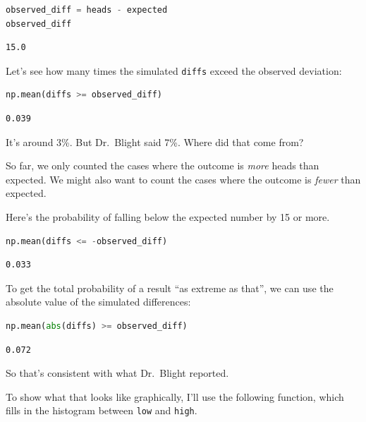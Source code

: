 \begin{lstlisting}[language=Python,style=source]
observed_diff = heads - expected
observed_diff
\end{lstlisting}

\begin{lstlisting}[style=output]
15.0
\end{lstlisting}

Let's see how many times the simulated \passthrough{\lstinline!diffs!}
exceed the observed deviation:

\begin{lstlisting}[language=Python,style=source]
np.mean(diffs >= observed_diff)
\end{lstlisting}

\begin{lstlisting}[style=output]
0.039
\end{lstlisting}

It's around 3\%. But Dr.~Blight said 7\%. Where did that come from?

So far, we only counted the cases where the outcome is \emph{more} heads
than expected. We might also want to count the cases where the outcome
is \emph{fewer} than expected.

Here's the probability of falling below the expected number by 15 or
more.

\begin{lstlisting}[language=Python,style=source]
np.mean(diffs <= -observed_diff)
\end{lstlisting}

\begin{lstlisting}[style=output]
0.033
\end{lstlisting}

To get the total probability of a result ``as extreme as that'', we can
use the absolute value of the simulated differences:

\begin{lstlisting}[language=Python,style=source]
np.mean(abs(diffs) >= observed_diff)
\end{lstlisting}

\begin{lstlisting}[style=output]
0.072
\end{lstlisting}

So that's consistent with what Dr.~Blight reported.

To show what that looks like graphically, I'll use the following
function, which fills in the histogram between
\passthrough{\lstinline!low!} and \passthrough{\lstinline!high!}.

